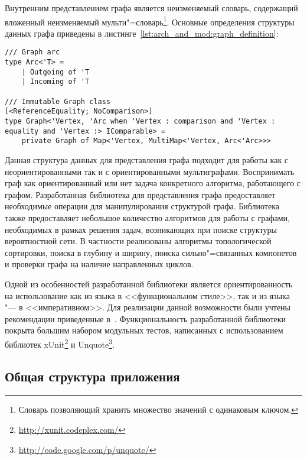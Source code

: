 Внутренним представлением графа является неизменяемый словарь, содержащий вложенный неизменяемый мульти"=словарь\footnote{Словарь позволяющий хранить множество значений с одинаковым ключом.}.
Основные определения структуры данных графа приведены в листинге~\ref{lst:arch_and_mod:graph_definition}:
\begin{lstlisting}[style=fsharpstyle,caption={Определение структуры данных для представления графа}, label=lst:arch_and_mod:graph_definition]
/// Graph arc 
type Arc<'T> =
    | Outgoing of 'T
    | Incoming of 'T

/// Immutable Graph class
[<ReferenceEquality; NoComparison>]
type Graph<'Vertex, 'Arc when 'Vertex : comparison and 'Vertex : equality and 'Vertex :> IComparable> = 
    private Graph of Map<'Vertex, MultiMap<'Vertex, Arc<'Arc>>>
\end{lstlisting}

Данная структура данных для представления графа подходит для работы как с неориентированными так и с ориентированными мультиграфами.
Воспринимать граф как ориентированный или нет задача конкретного алгоритма, работающего с графом.
Разработанная библиотека для представления графа предоставляет необходимые операции для манипулирования структурой графа. 
Библиотека также предоставляет небольшое количество алгоритмов для работы с графами, необходимых в рамках решения задач, возникающих при поиске структуры вероятностной сети.
В частности реализованы алгоритмы топологической сортировки, поиска в глубину и ширину, поиска сильно"=связанных компонетов и проверки графа на наличие направленных циклов. 

Одной из особенностей разработанной библиотеки является ориентированность на использование как из языка \fsharp{} в <<функциональном стиле>>, так и из языка \csharp{} "--- в <<императивном>>.
Для реализации данной возможности были учтены рекомендации приведенные в~\cite{fsdg_2010}.
Функциональность разработанной библиотеки покрыта большим набором модульных тестов, написанных с использованием библиотек xUnit\footnote{\url{http://xunit.codeplex.com/}} и Unquote\footnote{\url{http://code.google.com/p/unquote/}}.


\subsection{Общая структура приложения}
\label{sub:arch:struct}

